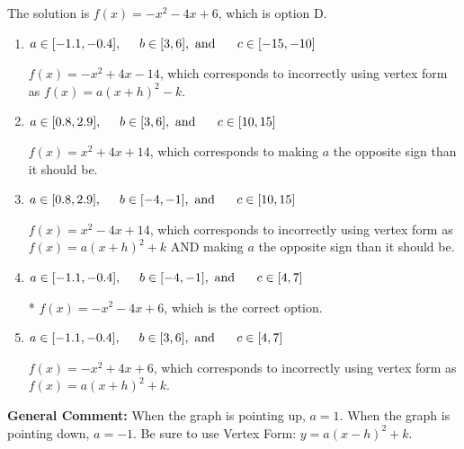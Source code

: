 \documentclass{extbook}[14pt]
\begin{document}
\begin{enumerate}
{The solution is \( f(x) = -x^{2} -4 x + 6 \), which is option D.\begin{enumerate}[label=\Alph*.]
\item \( a \in [-1.1, -0.4], \hspace*{5mm} b \in [3, 6], \text{ and } \hspace*{5mm} c \in [-15, -10] \)

$f(x)=-x^{2} +4 x -14$, which corresponds to incorrectly using vertex form as $f(x) = a(x+h)^2 - k$.
\item \( a \in [0.8, 2.9], \hspace*{5mm} b \in [3, 6], \text{ and } \hspace*{5mm} c \in [10, 15] \)

$f(x)=x^{2} +4 x + 14$, which corresponds to making $a$ the opposite sign than it should be.
\item \( a \in [0.8, 2.9], \hspace*{5mm} b \in [-4, -1], \text{ and } \hspace*{5mm} c \in [10, 15] \)

$f(x)=x^{2} -4 x + 14$, which corresponds to incorrectly using vertex form as $f(x) = a(x+h)^2+k$ AND making $a$ the opposite sign than it should be.
\item \( a \in [-1.1, -0.4], \hspace*{5mm} b \in [-4, -1], \text{ and } \hspace*{5mm} c \in [4, 7] \)

* $f(x)=-x^{2} -4 x + 6$, which is the correct option.
\item \( a \in [-1.1, -0.4], \hspace*{5mm} b \in [3, 6], \text{ and } \hspace*{5mm} c \in [4, 7] \)

$f(x)=-x^{2} +4 x + 6$, which corresponds to incorrectly using vertex form as $f(x) = a(x+h)^2+k$.
\end{enumerate}

\textbf{General Comment:} When the graph is pointing up, $a=1$. When the graph is pointing down, $a=-1$. Be sure to use Vertex Form: $y = a(x-h)^2+k$.
}
\end{enumerate}
\end{document}
